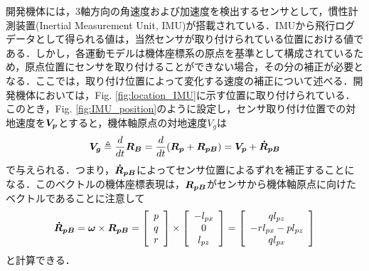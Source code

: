 開発機体には，3軸方向の角速度および加速度を検出するセンサとして，慣性計測装置(Inertial Measurement Unit, IMU)が搭載されている．IMUから飛行ログデータとして得られる値は，当然センサが取り付けられている位置における値である．しかし，各運動モデルは機体座標系の原点を基準として構成されているため，原点位置にセンサを取り付けることができない場合，その分の補正が必要となる．ここでは，取り付け位置によって変化する速度の補正について述べる．開発機体においては，Fig. \ref{fig:location_IMU}に示す位置に取り付けられている．このとき，Fig. \ref{fig:IMU_position}のように設定し，センサ取り付け位置での対地速度を$\mbox{\boldmath $V_p$}$とすると，機体軸原点の対地速度\mbox{\boldmath $V_g$}は
\begin{equation}
  \mbox{\boldmath $V_g$} \triangleq \dfrac{d}{dt}\mbox{\boldmath $R_{B}$} = \dfrac{d}{dt}(\mbox{\boldmath $R_{p}$} + \mbox{\boldmath $R_{pB}$}) =  \mbox{\boldmath $V_p$}+\mbox{\boldmath $\dot{R}_{pB}$}
\end{equation}
で与えられる．つまり，$\mbox{\boldmath $\dot{R}_{pB}$}$によってセンサ位置によるずれを補正することになる．このベクトルの機体座標表現は，$\mbox{\boldmath $R_{pB}$}$がセンサから機体軸原点に向けたベクトルであることに注意して
\begin{equation}
  \mbox{\boldmath $\dot{R}_{pB}$} = \mbox{\boldmath $\omega$}\times\mbox{\boldmath $R_{pB}$} =
  \left[
    \begin{array}{ccc}
      p \\
      q \\
      r
    \end{array}
  \right] \times
  \left[
    \begin{array}{ccc}
      -l_{px} \\
      0 \\
      l_{pz}
    \end{array}
  \right] =
  \left[
    \begin{array}{ccc}
      ql_{pz} \\
      -rl_{px} - pl_{pz} \\
      ql_{px}
    \end{array}
  \right]
\end{equation}
と計算できる．

